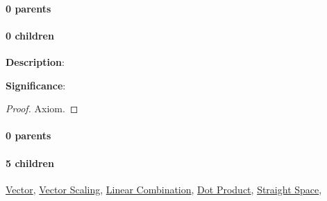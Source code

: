 \documentclass[../main.tex]{subfiles}
\begin{document}
\paragraph{0 parents} 
\paragraph{0 children} 




\begin{statement}
\label{statement:Real Numbers}\hspace*{0pt}\par
\end{statement}
\textbf{Description}:{\color{red} \todo}\par
{\color{magenta} \textbf{Significance}:{\color{red} \todo}\par}
\begin{proof}Axiom.\end{proof}\par
\paragraph{0 parents} 
\paragraph{5 children} \hyperref[statement:Vector]{Vector}, \hyperref[statement:Vector Scaling]{Vector Scaling}, \hyperref[statement:Linear Combination]{Linear Combination}, \hyperref[statement:Dot Product]{Dot Product}, \hyperref[statement:Straight Space]{Straight Space}, 
\end{document}
